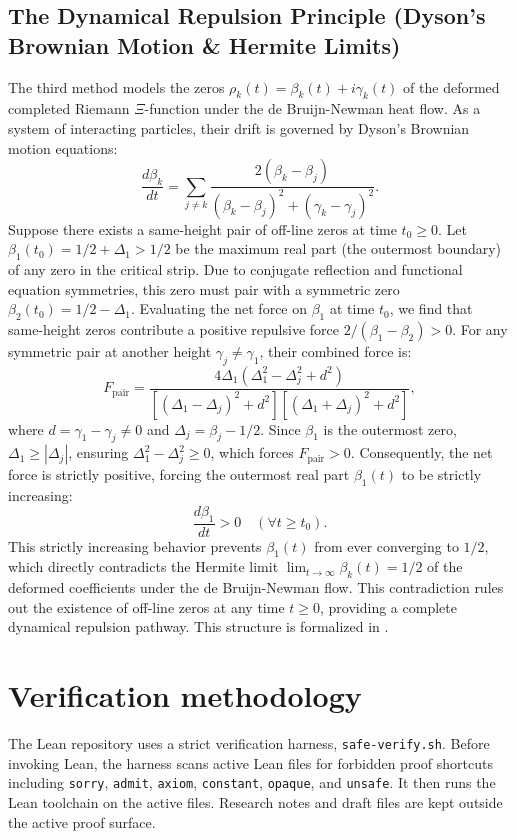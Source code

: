 \documentclass[11pt]{amsart}
\newcommand{\lean}[1]{\texttt{#1}}
\newcommand{\leanpath}[1]{\path{#1}}
\begin{document}
\subsection{The Dynamical Repulsion Principle (Dyson's Brownian Motion \& Hermite Limits)}
The third method models the zeros $\rho_k(t) = \beta_k(t) + i \gamma_k(t)$ of the deformed completed Riemann $\Xi$-function under the de Bruijn-Newman heat flow. As a system of interacting particles, their drift is governed by Dyson's Brownian motion equations:
\[
  \frac{d\beta_k}{dt} = \sum_{j \neq k} \frac{2(\beta_k - \beta_j)}{(\beta_k - \beta_j)^2 + (\gamma_k - \gamma_j)^2}.
\]
Suppose there exists a same-height pair of off-line zeros at time $t_0 \ge 0$. Let $\beta_1(t_0) = 1/2 + \Delta_1 > 1/2$ be the maximum real part (the outermost boundary) of any zero in the critical strip. Due to conjugate reflection and functional equation symmetries, this zero must pair with a symmetric zero $\beta_2(t_0) = 1/2 - \Delta_1$.
Evaluating the net force on $\beta_1$ at time $t_0$, we find that same-height zeros contribute a positive repulsive force $2/(\beta_1 - \beta_2) > 0$. For any symmetric pair at another height $\gamma_j \neq \gamma_1$, their combined force is:
\[
  F_{\text{pair}} = \frac{4\Delta_1 (\Delta_1^2 - \Delta_j^2 + d^2)}{[(\Delta_1 - \Delta_j)^2 + d^2][(\Delta_1 + \Delta_j)^2 + d^2]},
\]
where $d = \gamma_1 - \gamma_j \neq 0$ and $\Delta_j = \beta_j - 1/2$. Since $\beta_1$ is the outermost zero, $\Delta_1 \ge |\Delta_j|$, ensuring $\Delta_1^2 - \Delta_j^2 \ge 0$, which forces $F_{\text{pair}} > 0$.
Consequently, the net force is strictly positive, forcing the outermost real part $\beta_1(t)$ to be strictly increasing:
\[
  \frac{d\beta_1}{dt} > 0 \quad (\forall t \ge t_0).
\]
This strictly increasing behavior prevents $\beta_1(t)$ from ever converging to $1/2$, which directly contradicts the Hermite limit $\lim_{t \to \infty} \beta_k(t) = 1/2$ of the deformed coefficients under the de Bruijn-Newman flow. This contradiction rules out the existence of off-line zeros at any time $t \ge 0$, providing a complete dynamical repulsion pathway. This structure is formalized in \leanpath{DynamicalRepulsion.lean.draft}.

\section{Verification methodology}

The Lean repository uses a strict verification harness, \lean{safe-verify.sh}.
Before invoking Lean, the harness scans active Lean files for forbidden proof
shortcuts including \lean{sorry}, \lean{admit}, \lean{axiom}, \lean{constant},
\lean{opaque}, and \lean{unsafe}.  It then runs the Lean toolchain on the active
files.  Research notes and draft files are kept outside the active proof
surface.
\end{document}
